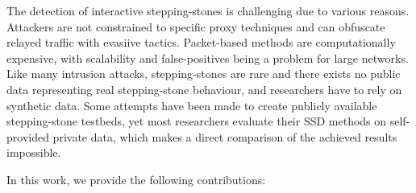 \documentclass[runningheads,11pt]{llncs}\usepackage[]{graphicx}\usepackage[]{color}
\begin{document}






The detection of interactive stepping-stones is challenging due to various reasons. Attackers are not constrained to specific proxy techniques and can obfuscate relayed traffic with  evasiive tactics. Packet-based methods are computationally expensive, with scalability and false-positives being a problem for large networks. Like many intrusion attacks, stepping-stones are rare and there exists no public data representing real stepping-stone behaviour, and researchers have to rely on synthetic data. Some attempts have been made to create publicly available stepping-stone testbeds, yet most researchers evaluate their SSD methods on self-provided private data, which makes a direct comparison of the achieved results impossible. 

In this work, we provide the following contributions:
\end{document}
